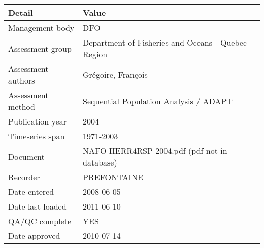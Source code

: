 \begin{table}[htb]
\centering
\begin{tabular}{lp{7cm}}
\toprule
Detail & Value \\
\midrule
Management body    & DFO                                                \\
Assessment group   & Department of Fisheries and Oceans - Quebec Region \\
Assessment authors & Gr\'{e}goire, Fran\c{c}ois                         \\
Assessment method  & Sequential Population Analysis / ADAPT             \\
Publication year   & 2004                                               \\
Timeseries span    & 1971-2003                                          \\
Document           & NAFO-HERR4RSP-2004.pdf (pdf not in database)       \\
Recorder           & PREFONTAINE                                        \\
Date entered       & 2008-06-05                                         \\
Date last loaded   & 2011-06-10                                         \\
QA/QC complete     & YES                                                \\
Date approved      & 2010-07-14                                         \\
\bottomrule
\end{tabular}
\label{tab:assessdet}
\end{table}
